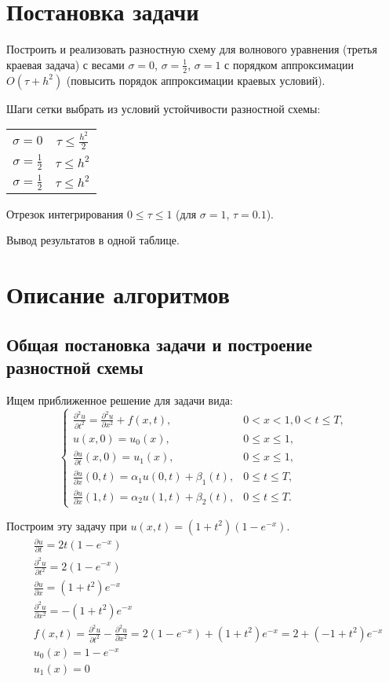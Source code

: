 





\chapter{Постановка задачи}
Построить и реализовать разностную схему для волнового уравнения (третья краевая задача) с весами $\sigma=0$, $\sigma=\frac{1}{2}$, $\sigma=1$ с порядком аппроксимации $O(\tau+h^2)$ (повысить порядок аппроксимации краевых условий).\par
Шаги сетки выбрать из условий устойчивости разностной схемы:
\begin{tabular}{cc}
$\sigma=0$ & $\tau \le \frac{h^{2}}{2}$ \\
$\sigma=\frac{1}{2}$ & $\tau \le h^{2}$ \\
$\sigma=\frac{1}{2}$ & $\tau \le h^{2}$
\end{tabular} \par
Отрезок интегрирования $0 \le \tau \le 1$ (для $\sigma=1$, $\tau = 0.1$). \par
Вывод результатов в одной таблице.

\chapter{Описание алгоритмов}
\section{Общая постановка задачи и построение разностной схемы}
Ищем приближенное решение для задачи вида:
\begin{equation}
\left\{
\begin{array}{ll}
\frac{\partial^{2} u}{\partial t^{2}}=\frac{\partial^{2} u}{\partial x^{2}}+f(x,t), & 0<x<1, 0<t\le T, \\
u(x,0)=u_{0}(x), & 0\le x \le 1, \\
\frac{\partial u}{\partial t}(x,0)=u_{1}(x), & 0\le x \le 1, \\
\frac{\partial u}{\partial x}(0,t)=\alpha_{1}u(0,t)+\beta_{1}(t), & 0 \le t \le T, \\
\frac{\partial u}{\partial x}(1,t)=\alpha_{2}u(1,t)+\beta_{2}(t), & 0 \le t \le T.
\end{array}
\right.
\end{equation}

Построим эту задачу при $u(x,t)=(1+t^{2})(1-e^{-x})$.
\begin{eqnarray*}
& \frac{\partial u}{\partial t}=2t(1-e^{-x}) \\
& \frac{\partial^{2} u}{\partial t^{2}}=2(1-e^{-x}) \\
& \frac{\partial u}{\partial x}=(1+t^{2})e^{-x} \\
& \frac{\partial^{2} u}{\partial x^{2}}=-(1+t^{2})e^{-x} \\
& f(x,t)=\frac{\partial^{2} u}{\partial t^{2}}-\frac{\partial^{2} u}{\partial x^{2}}=2(1-e^{-x})+(1+t^{2})e^{-x}=2+(-1+t^{2})e^{-x} \\
& u_{0}(x)=1 - e^{-x} \\
& u_{1}(x)=0
\end{eqnarray*}

